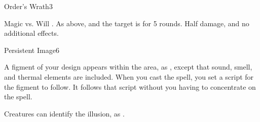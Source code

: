 
\begin{spellsection}{Order's Wrath}{3}
    \begin{spellheader}
    \end{spellheader}
    \begin{spellcontent}
        \begin{spelltargetinginfo}
        \end{spelltargetinginfo}
        \begin{spelleffects}
            \begin{spellattack}{Magic vs. Will}
                \spellsuccess {}.
                \spellcritical As above, and the target is \immobilized for 5 rounds.
                \spellfailure Half damage, and no additional effects.
            \end{spellattack}
        \end{spelleffects}
    \end{spellcontent}
    \begin{spellfooter}
        \miscastrandom
    \end{spellfooter}
\end{spellsection}

\begin{spellsection}{Persistent Image}{6}
    \begin{spellheader}
    \end{spellheader}
    \begin{spellcontent}
        \begin{spelltargetinginfo}
        \end{spelltargetinginfo}
        \begin{spelleffects}
            \spelleffect A figment of your design appears within the area, as , except that sound, smell, and thermal elements are included. When you cast the spell, you set a script for the figment to follow. It follows that script without you having to concentrate on the spell.
            \spelldur \durmed \dismissable
        \end{spelleffects}
    \end{spellcontent}
    \begin{spellfooter}
        \spellnotes Creatures can identify the illusion, as .
        \miscastexplode
    \end{spellfooter}
\end{spellsection}


